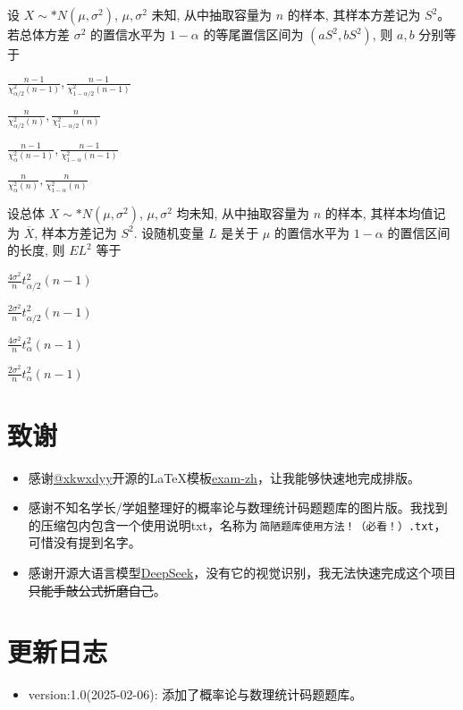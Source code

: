 \documentclass{exam-zh}
\begin{document}
\begin{question}
  设 $X \sim* N(\mu, \sigma^2)$, $\mu, \sigma^2$ 未知, 从中抽取容量为 $n$ 的样本, 其样本方差记为 $S^2$。 若总体方差 $\sigma^2$ 的置信水平为 $1 - \alpha$ 的等尾置信区间为 $(aS^2, bS^2)$, 则 $a, b$ 分别等于 \paren[A]
  
  \begin{choices}
    \item $\frac{n-1}{\chi^2_{\alpha/2}(n-1)}, \frac{n-1}{\chi^2_{1-\alpha/2}(n-1)}$
    \item $\frac{n}{\chi^2_{\alpha/2}(n)}, \frac{n}{\chi^2_{1-\alpha/2}(n)}$
    \item $\frac{n-1}{\chi^2_{\alpha}(n-1)}, \frac{n-1}{\chi^2_{1-\alpha}(n-1)}$
    \item $\frac{n}{\chi^2_{\alpha}(n)}, \frac{n}{\chi^2_{1-\alpha}(n)}$
  \end{choices}
\end{question}

\begin{question}
  设总体 $X \sim* N(\mu, \sigma^2)$, $\mu, \sigma^2$ 均未知, 从中抽取容量为 $n$ 的样本, 其样本均值记为 $\overline{X}$, 样本方差记为 $S^2$. 设随机变量 $L$ 是关于 $\mu$ 的置信水平为 $1 - \alpha$ 的置信区间的长度, 则 $EL^2$ 等于 \paren[A]
  
  \begin{choices}
    \item $\frac{4\sigma^2}{n}t^2_{\alpha/2}(n-1)$
    \item $\frac{2\sigma^2}{n}t^2_{\alpha/2}(n-1)$
    \item $\frac{4\sigma^2}{n}t^2_{\alpha}(n-1)$
    \item $\frac{2\sigma^2}{n}t^2_{\alpha}(n-1)$
  \end{choices}
\end{question}

\newpage
\thispagestyle{empty}
\addtocounter{page}{-1}

\section*{致谢}

\begin{itemize}
  \item 感谢\href{https://gitee.com/xkwxdyy}{@xkwxdyy}开源的\LaTeX{}模板\href{https://gitee.com/xkwxdyy/exam-zh}{exam-zh}，让我能够快速地完成排版。
  \item 感谢不知名学长/学姐整理好的概率论与数理统计码题题库的图片版。我找到的压缩包内包含一个使用说明txt，名称为\,\verb|简陋题库使用方法！（必看！）.txt|，可惜没有提到名字。
  \item 感谢开源大语言模型\href{https://www.deepseek.com/}{DeepSeek}，没有它的视觉识别，我无法快速完成这个项目\sout{只能手敲公式折磨自己}。
\end{itemize}

\section*{更新日志}
\begin{itemize}
  \item version:1.0(2025-02-06): 添加了概率论与数理统计码题题库。
\end{itemize}
\end{document}
